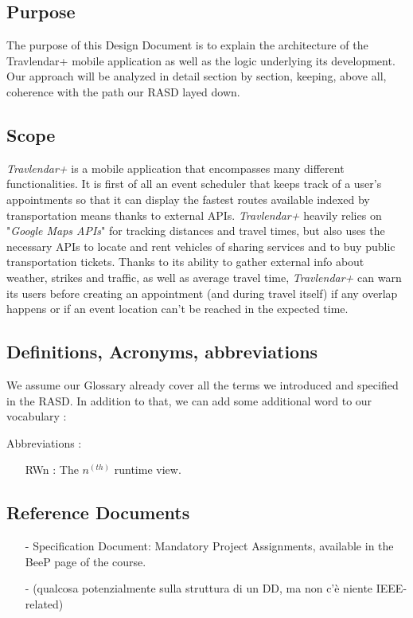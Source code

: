 \subsection{Purpose}
The purpose of this Design Document is to explain the architecture of the Travlendar+ mobile application as well as the logic underlying its development. Our approach will be analyzed in detail section by section, keeping, above all, coherence with the path our RASD layed down.

\subsection{Scope}
\textit{Travlendar+} is a mobile application that encompasses many different functionalities. 
It is first of all an event scheduler that keeps track of a user’s appointments so that it can display the fastest routes available indexed by transportation means thanks to external APIs.
\textit{Travlendar+} heavily relies on "\textit{Google Maps APIs}" for tracking distances and travel times, but also uses the necessary APIs to locate and rent vehicles of sharing services and to buy public transportation tickets. Thanks to its ability to gather external info about weather, strikes and traffic, as well as average travel time, \textit{Travlendar+} can warn its users before creating an appointment (and during travel itself) if any overlap happens or if an event location can’t be reached in the expected time.

\subsection{Definitions, Acronyms, abbreviations}
We assume our Glossary already cover all the terms we introduced and specified in the RASD. In addition to that, we can add some additional word to our vocabulary :

Abbreviations :
\begin{itemize}
	\item [RWn] : The $n^(th)$ runtime view.
\end{itemize}

\subsection{Reference Documents}
\begin{itemize}
		\item[-] \textsf{Specification Document: Mandatory Project Assignments}, available in the BeeP page of the course.
		\item[-] (qualcosa potenzialmente sulla struttura di un DD, ma non c’è niente IEEE-related)
\end{itemize} 


